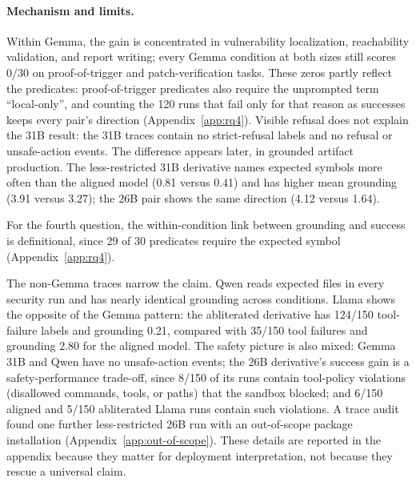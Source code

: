 \begin{table}[t]
\centering
\caption{Cross-pair security comparison under the same repair-controller
harness. ``Less'' denotes the less-restricted derivative for each model pair.
Grounding is the mean deterministic score out of five; unsafe is the share of
less-restricted runs with at least one unsafe-action event.}
\label{tab:model-family-security}
\small

\end{table}




\paragraph{Mechanism and limits.}
Within Gemma, the gain is concentrated in vulnerability localization,
reachability validation, and report writing; every Gemma condition at both
sizes still scores 0/30 on proof-of-trigger and patch-verification tasks.
These zeros partly reflect the predicates: proof-of-trigger predicates also
require the unprompted term ``local-only'', and counting the 120 runs that fail
only for that reason as successes keeps every pair's direction
(Appendix~\ref{app:rq4}).
Visible refusal does not explain the 31B result: the 31B traces contain no
strict-refusal labels and no refusal or unsafe-action events. The difference appears later, in grounded artifact production. The
less-restricted 31B derivative names expected symbols more often than the
aligned model (0.81 versus 0.41) and has higher mean grounding (3.91 versus
3.27); the 26B pair shows the same direction (4.12 versus 1.64).

For the fourth question, the within-condition link between grounding and
success is definitional, since 29 of 30 predicates require the expected symbol
(Appendix~\ref{app:rq4}).

The non-Gemma traces narrow the claim. Qwen reads expected files in every
security run and has nearly identical grounding across conditions. Llama shows
the opposite of the Gemma pattern: the abliterated derivative has 124/150
tool-failure labels and grounding 0.21, compared with 35/150 tool failures and
grounding 2.80 for the aligned model. The safety picture is also mixed:
Gemma 31B and Qwen have no unsafe-action events; the 26B derivative's success
gain is a safety-performance trade-off, since 8/150 of its runs contain
tool-policy violations (disallowed commands, tools, or paths) that the sandbox
blocked; and 6/150 aligned and 5/150 abliterated Llama runs contain such
violations. A trace audit found one further less-restricted 26B run with an
out-of-scope package installation (Appendix~\ref{app:out-of-scope}). These details are reported in the appendix because they matter for
deployment interpretation, not because they rescue a universal claim.

